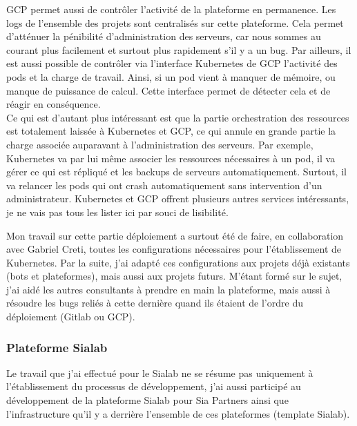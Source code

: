 \documentclass{article} %
\begin{document}
{GCP permet aussi de contrôler l'activité de la plateforme en permanence. Les logs de l'ensemble des projets sont centralisés sur cette plateforme. Cela permet d'atténuer la pénibilité d'administration des serveurs, car nous sommes au courant plus facilement et surtout plus rapidement s'il y a un bug. Par ailleurs, il est aussi possible de contrôler via l'interface Kubernetes de GCP l'activité des pods et la charge de travail. Ainsi, si un pod vient à manquer de mémoire, ou manque de puissance de calcul. Cette interface permet de détecter cela et de réagir en conséquence.\\
Ce qui est d'autant plus intéressant est que la partie orchestration des ressources est totalement laissée à Kubernetes et GCP, ce qui annule en grande partie la charge associée auparavant à l'administration des serveurs. Par exemple, Kubernetes va par lui même associer les ressources nécessaires à un pod, il va gérer ce qui est répliqué et les backups de serveurs automatiquement. Surtout, il va relancer les pods qui ont crash automatiquement sans intervention d'un administrateur. Kubernetes et GCP offrent plusieurs autres services intéressants, je ne vais pas tous les lister ici par souci de lisibilité. 


Mon travail sur cette partie déploiement a surtout été de faire, en collaboration avec Gabriel Creti, toutes les configurations nécessaires pour l'établissement de Kubernetes. Par la suite, j'ai adapté ces configurations aux projets déjà existants (bots et plateformes), mais aussi aux projets futurs. M'étant formé sur le sujet, j'ai aidé les autres consultants à prendre en main la plateforme, mais aussi à résoudre les bugs reliés à cette dernière quand ils étaient de l'ordre du déploiement (Gitlab ou GCP). 

\subsubsection{Plateforme Sialab}
Le travail que j'ai effectué pour le Sialab ne se résume pas uniquement à l'établissement du processus de développement, j'ai aussi participé au développement de la plateforme Sialab pour Sia Partners ainsi que l'infrastructure qu'il y a derrière l'ensemble de ces plateformes (template Sialab).\\

}
\end{document}
